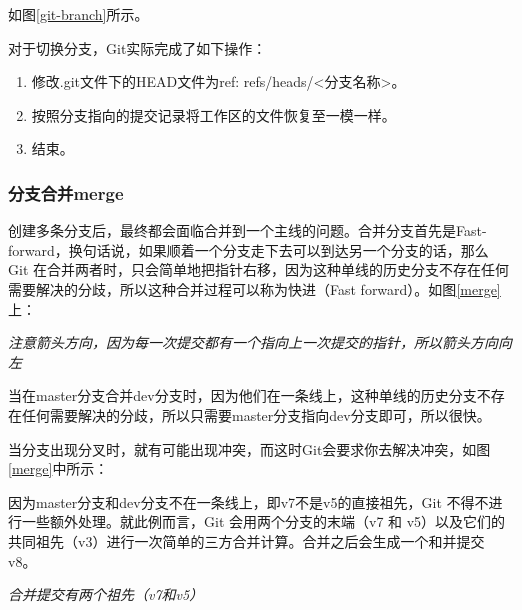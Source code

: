 如图\ref{git-branch}所示。

对于切换分支，Git实际完成了如下操作：
\begin{enumerate}
    \item 修改.git文件下的HEAD文件为ref: refs/heads/<分支名称>。
    \item 按照分支指向的提交记录将工作区的文件恢复至一模一样。
    \item 结束。
\end{enumerate}

\subsubsection{分支合并merge}
创建多条分支后，最终都会面临合并到一个主线的问题。合并分支首先是Fast-forward，换句话说，如果顺着一个分支走下去可以到达另一个分支的话，那么 Git 在合并两者时，只会简单地把指针右移，因为这种单线的历史分支不存在任何需要解决的分歧，所以这种合并过程可以称为快进（Fast forward）。如图\ref{merge}上：
\begin{remark}
    \textit{注意箭头方向，因为每一次提交都有一个指向上一次提交的指针，所以箭头方向向左}
\end{remark}

当在master分支合并dev分支时，因为他们在一条线上，这种单线的历史分支不存在任何需要解决的分歧，所以只需要master分支指向dev分支即可，所以很快。

当分支出现分叉时，就有可能出现冲突，而这时Git会要求你去解决冲突，如图\ref{merge}中所示：

因为master分支和dev分支不在一条线上，即v7不是v5的直接祖先，Git 不得不进行一些额外处理。就此例而言，Git 会用两个分支的末端（v7 和 v5）以及它们的共同祖先（v3）进行一次简单的三方合并计算。合并之后会生成一个和并提交v8。

\begin{remark}
    \textit{合并提交有两个祖先（v7和v5）}
\end{remark}

